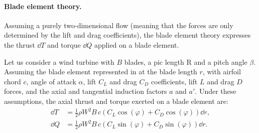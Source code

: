 \paragraph{Blade element theory.}
Assuming a purely two-dimensional flow (meaning that the forces are only determined by the lift and drag coefficients), the blade element theory expresses the thrust $\dd T$ and torque $\dd Q$ applied on a blade element.

Let us consider a wind turbine with $B$ blades, a pic length R and a pitch angle $\beta$. 
Assuming the blade element represented in  at the blade length $r$, with airfoil chord $c$, angle of attack $\alpha$,  lift $C_L$ and drag $C_D$ coefficients, lift $L$ and drag $D$ forces, and the axial and tangential induction factors $a$ and $a'$. 
Under these assumptions, the axial thrust and torque exerted on a blade element are:
\begin{subequations}
    \begin{align}
        \dd T &= \frac12 \rho W^2 B\, c \left(C_L \cos(\varphi) + C_D \cos(\varphi)\right) \dd r,\\
        \dd Q &= \frac12 \rho W^2 B\, c \left(C_L \sin(\varphi) + C_D \sin(\varphi)\right) \dd r.
    \end{align}
    \label{eq:blade_element}    
\end{subequations}

